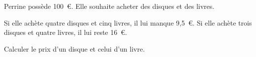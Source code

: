 %
%
    Perrine possède 100~€. Elle souhaite acheter des disques et des livres.

    Si elle achète quatre disques et cinq livres, il lui manque 9,5~€. Si elle achète trois disques et quatre livres, il lui reste 16~€.

    Calculer le prix d'un disque et celui d'un livre.

